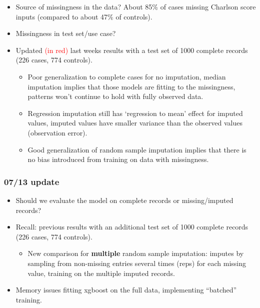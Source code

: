 \documentclass[12pt]{article}
\newcommand{\note}[1]{\textcolor{red}{#1}}
\begin{document}
\begin{itemize}
  \item Source of missingness in the data? About 85\% of cases missing Charlson score inputs (compared to about 47\% of controls).
  \item Missingness in test set/use case?
  \item Updated \note{(in red)} last weeks results with a test set of 1000 complete records (226 cases, 774 controls).
  \begin{itemize}
    \item Poor generalization to complete cases for no imputation, median imputation implies that those models are fitting to the missingness, patterns won't continue to hold with fully observed data.
    \item Regression imputation still has `regression to mean' effect for imputed values, imputed values have smaller variance than the observed values (observation error).
    \item Good generalization of random sample imputation implies that there is no bias introduced from training on data with missingness.
  \end{itemize}
\end{itemize}

\pagebreak

\subsubsection*{07/13 update}

\begin{itemize}
  \item Should we evaluate the model on complete records or missing/imputed records?
  \item Recall: previous results with an additional test set of 1000 complete records (226 cases, 774 controls).
  \begin{itemize}
    \item New comparison for \textbf{multiple} random sample imputation: imputes by sampling from non-missing entries several times (reps) for each missing value, training on the multiple imputed records.
  \end{itemize}
  \item Memory issues fitting xgboost on the full data, implementing ``batched'' training.
\end{itemize}
\end{document}
